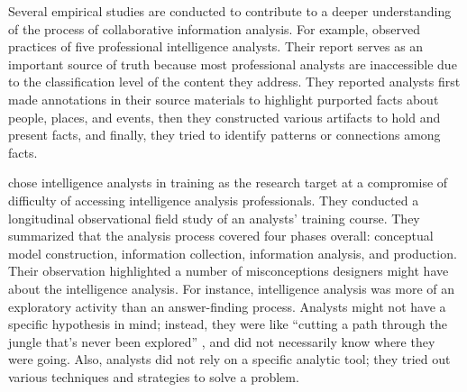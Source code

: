 Several empirical studies are conducted to contribute to a deeper understanding
of the process of collaborative information analysis. For example, \cite{Chin2009} observed practices of five professional intelligence analysts. Their report serves as an important source of truth because most professional analysts are inaccessible due to the classification level of
the content they address. They reported analysts first made annotations in their
source materials to highlight purported facts about people, places, and events,
then they constructed various artifacts to hold and present facts, and finally,
they tried to identify patterns or connections among facts. 

\cite{Kang2012d} chose intelligence analysts in training as the research target at a compromise of difficulty of accessing intelligence analysis professionals. They conducted a longitudinal observational field study of an analysts' training course. They summarized that the analysis process covered four phases
overall: conceptual model construction, information collection, information
analysis, and production. Their observation highlighted a number of
misconceptions designers might have about the intelligence analysis. For
instance, intelligence analysis was more of an exploratory activity than an
answer-finding process. Analysts might not have a specific hypothesis in mind;
instead, they were like ``cutting a path through the jungle that’s never been
explored'' \citep[p.145]{Kang2012b}, and did not necessarily know where they
were going. Also, analysts did not rely
on a specific analytic tool; they tried out various techniques and strategies to
solve a problem. 

